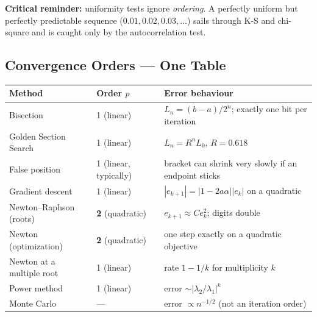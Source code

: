 \vspace{4pt}
\noindent\textbf{Critical reminder:} uniformity tests ignore \emph{ordering}. A perfectly uniform but perfectly predictable sequence ($0.01, 0.02, 0.03,\dots$) sails through K-S and chi-square and is caught only by the autocorrelation test.

\subsection{Convergence Orders --- One Table}

\begin{center}\small
\renewcommand{\arraystretch}{1.4}
\begin{tabular}{@{}p{}p{}p{}@{}}
\toprule
\textbf{Method} & \textbf{Order $p$} & \textbf{Error behaviour} \\
\midrule
Bisection & 1 (linear) & $L_n=(b-a)/2^n$; exactly one bit per iteration \\
Golden Section Search & 1 (linear) & $L_n = R^nL_0$, $R=0.618$ \\
False position & 1 (linear, typically) & bracket can shrink very slowly if an endpoint sticks \\
Gradient descent & 1 (linear) & $|e_{k+1}|=|1-2a\alpha||e_k|$ on a quadratic \\
Newton--Raphson (roots) & \textbf{2} (quadratic) & $e_{k+1}\approx C e_k^2$; digits double \\
Newton (optimization) & \textbf{2} (quadratic) & one step exactly on a quadratic objective \\
Newton at a multiple root & 1 (linear) & rate $1-1/k$ for multiplicity $k$ \\
Power method & 1 (linear) & error $\sim|\lambda_2/\lambda_1|^k$ \\
Monte Carlo & --- & error $\propto n^{-1/2}$ (not an iteration order) \\
\bottomrule
\end{tabular}
\end{center}
\renewcommand{\arraystretch}{1.25}
